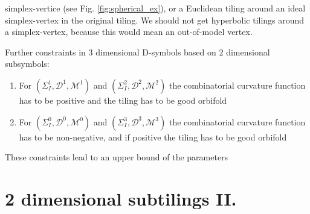 \begin{frame}
\begin{itemize}
{	simplex-vertice (see Fig. \ref{fig:spherical_ex}), or a Euclidean tiling
	around an ideal simplex-vertex in the original tiling. We should not get
	hyperbolic tilings around a simplex-vertex, because this would mean an
	out-of-model vertex.}
    \end{itemize}
    \begin{figure}
    \end{figure}
\end{frame}

\begin{frame}
  Further constraints in $3$ dimensional D-symbols based on $2$ dimensional
  subsymbols:
  \begin{enumerate}
    \item For $(\Sigma_I^1,\mathcal{D}^1,\mathcal{M}^1)$ and
      $(\Sigma_I^2,\mathcal{D}^2,\mathcal{M}^2)$ the combinatorial curvature
      function has to be positive and the tiling has to be good
      orbifold
    \item For $(\Sigma_I^0,\mathcal{D}^0,\mathcal{M}^0)$ and
      $(\Sigma_I^3,\mathcal{D}^3,\mathcal{M}^3)$ the combinatorial curvature 
      function has to be non-negative, and if positive the tiling has to be good
      orbifold
  \end{enumerate}
  These constraints lead to an upper bound of the parameters 
\end{frame}

\section{2 dimensional subtilings II.}

